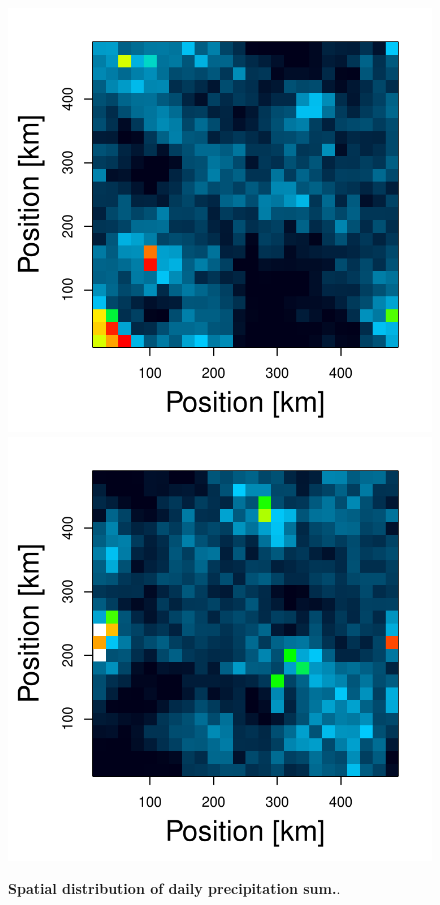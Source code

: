 \documentclass[draft]{agujournal2019}
\begin{document}
\begin{figure}
\includegraphics[trim={2cm 2cm 1cm 1cm}, clip, height=0.24\linewidth]{1773-2040_T0_300K_ampl_10_1km_r_int_timmean_xy_plot.pdf}
\includegraphics[trim={2cm 2cm 1cm 1cm}, clip, height=0.24\linewidth]{2061-2348_T0_300K_ampl_10_1km_r_int_timmean_xy_plot.pdf}
\caption{{\bf Spatial distribution of daily precipitation sum.}. }
\label{fig:daily_sum_5K}
\end{figure}
\end{document}
